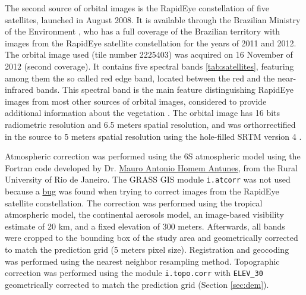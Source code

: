 The second source of orbital images is the RapidEye constellation of five satellites, launched in August 2008. It is available through the Brazilian Ministry of the Environment \cite{Brasil2012}, who has a full coverage of the Brazilian territory with images from the RapidEye satellite constellation for the years of 2011 and 2012. The orbital image used (tile number 2225403) was acquired on 16 November of 2012 (second coverage). It contains five spectral bands \ref{tab:satellites}, featuring among them the so called red edge band, located between the red and the near-infrared bands. This spectral band is the main feature distinguishing RapidEye images from most other sources of orbital images, considered to provide additional information about the vegetation \cite{WeicheltEtAl2013}. The orbital image has 16 bits radiometric resolution and 6.5 meters spatial resolution, and was orthorrectified in the source to 5 meters spatial resolution using the hole-filled SRTM version 4 \cite{RapidEye2013}.

Atmospheric correction was performed using the 6S atmospheric model \cite{VermoteEtAl1997} using the Fortran code developed by Dr. \href{http://lattes.cnpq.br/3818721407909667}{Mauro Antonio Homem Antunes}, from the Rural University of Rio de Janeiro. The GRASS GIS module \texttt{i.atcorr} was not used because a \href{http://osgeo-org.1560.x6.nabble.com/i-atcorr-returns-nan-for-Landsat-5-TM-bands-1-and-2-tt5106456.html#a5118122}{bug} was found when trying to correct images from the RapidEye satellite constellation. The correction was performed using the tropical atmospheric model, the continental aerosols model, an image-based visibility estimate of 20 km, and a fixed elevation of 300 meters. Afterwards, all bands were cropped to the bounding box of the study area and geometrically corrected to match the prediction grid (5 meters pixel size). Registration and geocoding was performed using the nearest neighbor resampling method. Topographic correction was performed using the module \texttt{i.topo.corr} with \texttt{ELEV\_30} geometrically corrected to match the prediction grid (Section \ref{sec:dem}).

